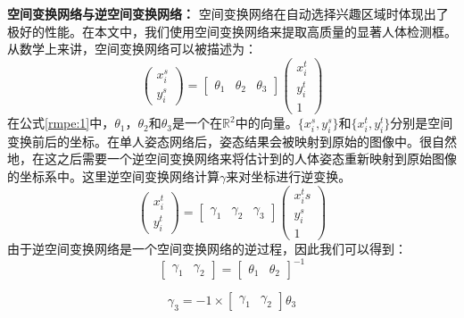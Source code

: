 \textbf{空间变换网络与逆空间变换网络：} 空间变换网络在自动选择兴趣区域时体现出了极好的性能。在本文中，我们使用空间变换网络来提取高质量的显著人体检测框。从数学上来讲，空间变换网络可以被描述为：
\begin{equation*}
\label{rmpe:1}
\begin{pmatrix}
x_i^s \\
y_i^s
\end{pmatrix}
= 
\begin{bmatrix}
\theta_1 & \theta_2 & \theta_3
\end{bmatrix}
\begin{pmatrix}
x_i^t \\
y_i^t \\
1
\end{pmatrix}
\end{equation*}
在公式\eqref{rmpe:1}中，$\theta_1$，$\theta_2$和$\theta_3$是一个在$\mathbb{R}^2$中的向量。$\{x_i^s, y_i^s\}$和$\{x_i^t,y_i^t\}$分别是空间变换前后的坐标。在单人姿态网络后，姿态结果会被映射到原始的图像中。很自然地，在这之后需要一个逆空间变换网络来将估计到的人体姿态重新映射到原始图像的坐标系中。这里逆空间变换网络计算$\gamma$来对坐标进行逆变换。
\begin{equation*}
\label{rmpe:2}
\begin{pmatrix}
x_i^t \\
y_i^t
\end{pmatrix}
= 
\begin{bmatrix}
\gamma_1 & \gamma_2 & \gamma_3
\end{bmatrix}
\begin{pmatrix}
x_i^ts\\
y_i^s\\
1
\end{pmatrix}
\end{equation*}
由于逆空间变换网络是一个空间变换网络的逆过程，因此我们可以得到：
\begin{equation*}
\label{rmpe:3}
\begin{bmatrix}
\gamma_1 & \gamma_2
\end{bmatrix}
=
\begin{bmatrix}
\theta_1 & \theta_2
\end{bmatrix}^{-1}
\end{equation*}

\begin{equation*}
\label{rmpe:4}
\gamma_3 = -1 \times 
\begin{bmatrix}
\gamma_1 & \gamma_2
\end{bmatrix}
\theta_3
\end{equation*}

